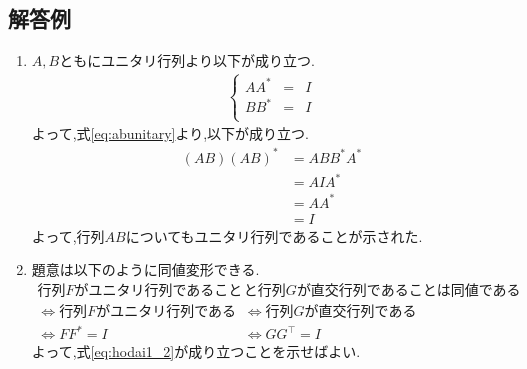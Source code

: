 \subsection{解答例}
\begin{enumerate}[(1)]
    \setlength{\itemsep}{10pt}
    \item $A, B$ともにユニタリ行列より以下が成り立つ.
    \begin{align}
        \left\{
            \begin{array}{lcl}
            AA^{\ast} &=& I\\ 
            BB^{\ast} &=& I\\ 
            \end{array}
        \right.\label{eq:abunitary}
    \end{align}
    よって,式\eqref{eq:abunitary}より,以下が成り立つ.
    \begin{align*}
        (AB)(AB)^{\ast} & = ABB^{\ast}A^{\ast}\\
                        & = AIA^{\ast}\\
                        & = AA^{\ast}\\
                        & = I
    \end{align*}
    よって,行列$AB$についてもユニタリ行列であることが示された.
    \item 題意は以下のように同値変形できる.
    \begin{align}
        \mbox{行列$F$がユニタリ行列であること}&\mbox{と行列$G$が直交行列であることは同値である}\nonumber\\
        \Longleftrightarrow \mbox{行列$F$がユニタリ行列である} &\Leftrightarrow \mbox{行列$G$が直交行列である} \nonumber\\
        \Longleftrightarrow FF^{\ast} = I &\Leftrightarrow GG^{\top} = I\label{eq:hodai1_2}
    \end{align}
    よって,式\eqref{eq:hodai1_2}が成り立つことを示せばよい.


\end{enumerate}
